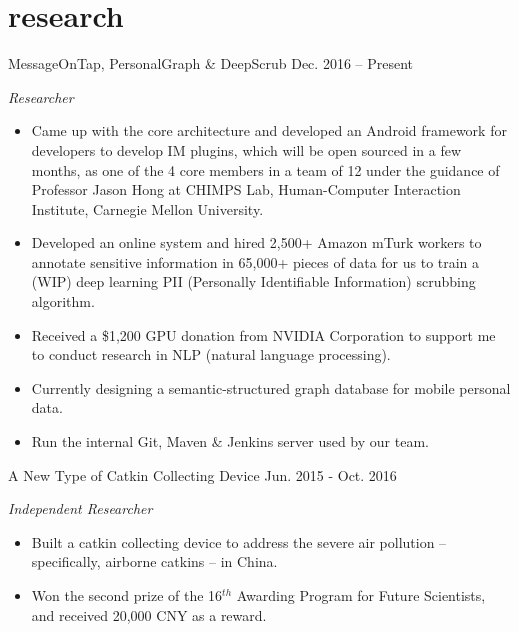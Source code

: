 \documentclass[hidelinks__VERSION__]{adamyi-cv} %
\begin{document}
\pagebreak



\section{research}

\begin{entrylist}


\entry
{MessageOnTap, PersonalGraph \& DeepScrub}
{Dec. 2016 -- Present}
{\emph{Researcher}
\begin{itemize}
\item Came up with the core architecture and developed an Android framework for developers to develop IM plugins, which will be open sourced in a few months, as one of the 4 core members in a team of 12 under the guidance of Professor Jason Hong at CHIMPS Lab, Human-Computer Interaction Institute, Carnegie Mellon University.
\item Developed an online system and hired 2,500+ Amazon mTurk workers to annotate sensitive information in 65,000+ pieces of data for us to train a (WIP) deep learning PII (Personally Identifiable Information) scrubbing algorithm.
\item Received a \$1,200 GPU donation from NVIDIA Corporation to support me to conduct research in NLP (natural language processing).
\item Currently designing a semantic-structured graph database for mobile personal data.
\item Run the internal Git, Maven \& Jenkins server used by our team.
\end{itemize}}


\entry
{A New Type of Catkin Collecting Device}
{Jun. 2015 - Oct. 2016}
{\emph{Independent Researcher}
\begin{itemize}
\item Built a catkin collecting device to address the severe air pollution – specifically, airborne catkins – in China.
\item Won the second prize of the 16$^{th}$ Awarding Program for Future Scientists, and received 20,000 CNY as a reward.
\end{itemize}}


\end{entrylist}
\end{document}
